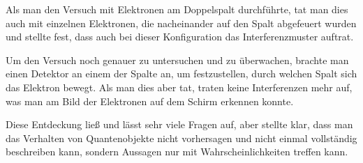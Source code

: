 Als man den Versuch mit Elektronen am Doppelspalt durchführte, tat man dies auch mit einzelnen Elektronen, die nacheinander auf den Spalt \glqq abgefeuert\grqq{} wurden und stellte fest, dass auch bei dieser Konfiguration das Interferenzmuster auftrat.

Um den Versuch noch genauer zu untersuchen und zu überwachen, brachte man einen Detektor an einem der Spalte an, um festzustellen, durch welchen Spalt sich das Elektron bewegt. Als man dies aber tat, traten keine Interferenzen mehr auf, was man am Bild der Elektronen auf dem Schirm erkennen konnte.

Diese Entdeckung ließ und lässt sehr viele Fragen auf, aber stellte klar, dass man das Verhalten von Quantenobjekte nicht vorhersagen und nicht einmal vollständig beschreiben kann, sondern Aussagen nur mit Wahrscheinlichkeiten treffen kann.